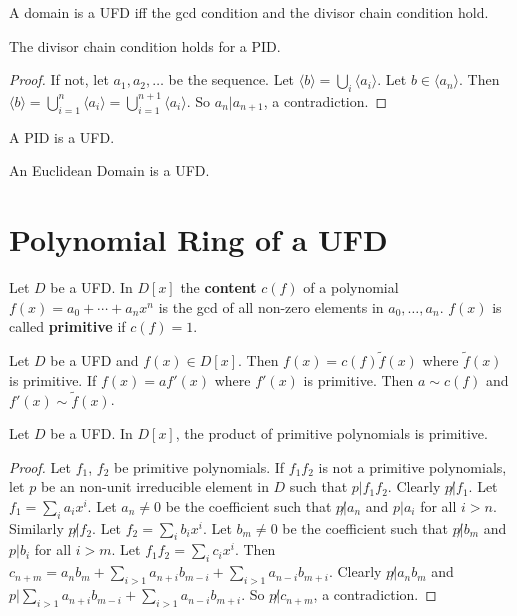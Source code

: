 \documentclass[12pt]{book}
\begin{document}
\begin{corollary}
	A domain is a UFD iff the gcd condition and the divisor chain condition hold.
\end{corollary}

\begin{lemma}
	The divisor chain condition holds for a PID.
\end{lemma}
\begin{proof}
	If not, let $a_1,a_2,\dots$ be the sequence. Let $\langle b\rangle=\bigcup_i\langle a_i\rangle$. Let $b\in \langle a_n\rangle$. Then $\langle b\rangle=\bigcup_{i=1}^n\langle a_i\rangle=\bigcup_{i=1}^{n+1}\langle a_i\rangle$. So $a_n|a_{n+1}$, a contradiction.
\end{proof}

\begin{corollary}
	A PID is a UFD.
\end{corollary}

\begin{corollary}
	An Euclidean Domain is a UFD. 
\end{corollary}

\section{Polynomial Ring of a UFD}

\begin{definition}
	Let $D$ be a UFD. In $D[x]$ the {\bf content} $c(f)$ of a polynomial $f(x)=a_0+\cdots +a_nx^n$ is the gcd of all non-zero elements in $a_0,\dots,a_n$. $f(x)$ is called {\bf primitive} if $c(f)=1$. 
\end{definition}

\begin{lemma}
	Let $D$ be a UFD and $f(x)\in D[x]$. Then $f(x)=c(f)\tilde f(x)$ where $\tilde f(x)$ is primitive. If $f(x)=af'(x)$ where $f'(x)$ is primitive. Then $a\sim c(f)$ and $f'(x)\sim \tilde f(x)$.
\end{lemma}

\begin{lemma}
	Let $D$ be a UFD. In $D[x]$, the product of primitive polynomials is primitive.
\end{lemma}
\begin{proof}
	Let $f_1$, $f_2$ be primitive polynomials. If $f_1f_2$ is not a primitive polynomials, let $p$ be an non-unit irreducible element in $D$ such that $p|f_1f_2$. Clearly $p\not| f_1$. Let $f_1=\sum_ia_ix^i$. Let $a_n\neq 0$ be the coefficient such that $p\not| a_n$ and $p | a_i$ for all $i>n$. Similarly $p\not| f_2$. Let $f_2=\sum_ib_ix^i$. Let $b_m\neq 0$ be the coefficient such that $p\not| b_m$ and $p | b_i$ for all $i>m$. Let $f_1f_2=\sum_ic_ix^i$. Then $c_{n+m}=a_nb_m+\sum_{i>1}a_{n+i}b_{m-i}+\sum_{i>1}a_{n-i}b_{m+i}$. Clearly $p\not|a_nb_m$ and $p|\sum_{i>1}a_{n+i}b_{m-i}+\sum_{i>1}a_{n-i}b_{m+i}$. So $p\not| c_{n+m}$, a contradiction.
\end{proof}
\end{document}
